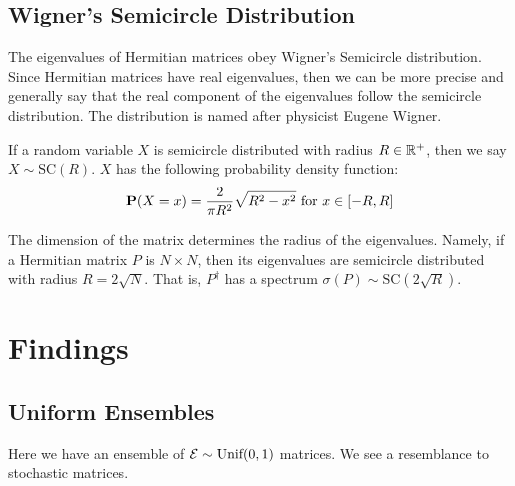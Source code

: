 
\newpage
\subsection{Wigner's Semicircle Distribution}

The eigenvalues of Hermitian matrices obey Wigner's Semicircle distribution. Since Hermitian matrices have real eigenvalues, then we can be more precise and generally say that the real component of the eigenvalues follow the semicircle distribution. The distribution is named after physicist Eugene Wigner.

\begin{definition}
If a random variable $X$ is semicircle distributed with radius $R \in \mathbb{R}^+$, then we say $X \sim \text{SC}(R)$. $X$ has the following probability density function:
$$\textbf{P}(X = x) = \frac{2}{\pi R^2} \sqrt{R^2 - x^2} \text{ for } x \in [-R, R]$$
\end{definition}

\begin{remark}
The dimension of the matrix determines the radius of the eigenvalues. Namely, if a Hermitian matrix $P$ is $N \times N$, then its eigenvalues are semicircle distributed with radius $R = 2\sqrt{N}$. That is, $P^{\dagger}$ has a spectrum $\sigma({P}) \sim \text{SC}(2\sqrt{R})$.
\end{remark}


\newpage
\section{Findings}
\subsection{Uniform Ensembles}
Here we have an ensemble of $\mathcal{E} \sim \text{Unif}(0,1)$ matrices. We see a resemblance to
stochastic matrices.

